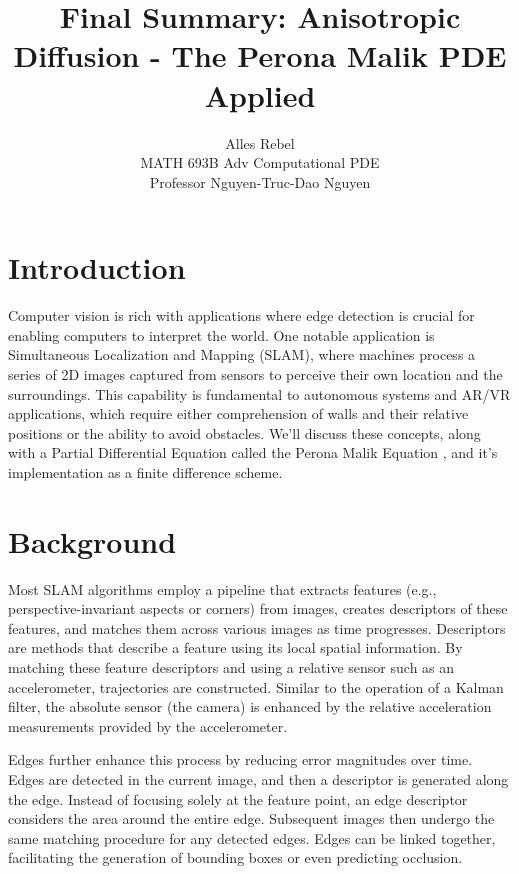 \documentclass{article}
\title{Final Summary: Anisotropic Diffusion - The Perona Malik PDE Applied}
\author{
	Alles Rebel \\
	MATH 693B Adv Computational PDE \\
	Professor Nguyen-Truc-Dao Nguyen
}
\begin{document}
\maketitle

\section*{Introduction}
Computer vision is rich with applications where edge detection is crucial for enabling computers to interpret the world. One notable application is Simultaneous Localization and Mapping (SLAM), where machines process a series of 2D images captured from sensors to perceive their own location and the surroundings. This capability is fundamental to autonomous systems and AR/VR applications, which require either comprehension of walls and their relative positions or the ability to avoid obstacles. We'll discuss these concepts, along with a Partial Differential Equation called the Perona Malik Equation \cite{perona1987scale}, and it's implementation as a finite difference scheme.

\section*{Background}
Most SLAM algorithms employ a pipeline that extracts features (e.g., perspective-invariant aspects or corners) from images, creates descriptors of these features, and matches them across various images as time progresses. Descriptors are methods that describe a feature using its local spatial information. By matching these feature descriptors and using a relative sensor such as an accelerometer, trajectories are constructed. Similar to the operation of a Kalman filter, the absolute sensor (the camera) is enhanced by the relative acceleration measurements provided by the accelerometer.

Edges further enhance this process by reducing error magnitudes over time. Edges are detected in the current image, and then a descriptor is generated along the edge. Instead of focusing solely at the feature point, an edge descriptor considers the area around the entire edge. Subsequent images then undergo the same matching procedure for any detected edges. Edges can be linked together, facilitating the generation of bounding boxes or even predicting occlusion.
\end{document}
